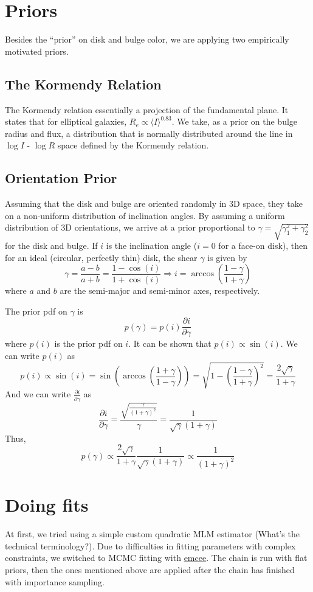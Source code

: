 \documentclass{article}
\newcommand{\comment}[1]{{\color{red} (#1)}}
\begin{document}
\section{Priors}
Besides the ``prior'' on disk and bulge color, we are applying two 
empirically motivated priors.
\subsection{The Kormendy Relation}
The Kormendy relation essentially a projection of the fundamental
plane.  It states that for elliptical galaxies, 
$R_e \propto \langle I \rangle^{0.83}$.  
We take, as a prior on the bulge radius and flux, a
distribution that is normally distributed around the line in $\log I$
- $\log R$ space defined by the Kormendy relation.

\subsection{Orientation Prior}
Assuming that the disk and bulge are oriented randomly in 3D space, 
they take on a non-uniform distribution of inclination angles.  By
assuming a uniform distribution of 3D orientations, we arrive at a
 prior proportional to $\gamma = \sqrt{\gamma_1^2 + \gamma_2^2}$ for the disk and bulge.
If $i$ is the inclination angle ($i = 0$ for a face-on disk), then for an ideal
(circular, perfectly thin) disk, the shear $\gamma$ is given by
\[
\gamma = \frac{a - b}{a + b} = \frac{1 - \cos(i)}{1 + \cos(i)}
\Rightarrow i = \arccos{\left( \frac{1 - \gamma}{1 + \gamma} \right) }
\]
where $a$ and $b$ are the semi-major and semi-minor axes, respectively.

The prior pdf on $\gamma$ is 
\[
p(\gamma) = p(i) \frac{\partial i}{\partial \gamma}
\]
where $p(i)$ is the prior pdf on $i$. It can be shown that
$p(i) \propto \sin (i)$.  We can write $p(i)$ as
\[
p(i) \propto \sin(i)
= \sin \left( \arccos \left( \frac{1 + \gamma}{1 - \gamma} \right) \right)
= \sqrt{1 - \left( \frac{1 - \gamma}{1 + \gamma} \right)^2}
= \frac{2 \sqrt{\gamma}}{1 + \gamma}
\]
And we can write $\frac{\partial i}{\partial \gamma}$ as
\[
\frac{\partial i}{\partial \gamma} 
= \frac{\sqrt{\frac{\gamma}{(1 + \gamma)^2}}}{\gamma}
= \frac{1}{\sqrt{\gamma} (1 + \gamma)}
\]
Thus, 
\[
p(\gamma) \propto \frac{2 \sqrt{\gamma}}{1 + \gamma} \frac{1}{\sqrt{\gamma} (1 + \gamma)}
\propto \frac{1}{(1 + \gamma)^2}
\]


\section{Doing fits}
At first, we tried using a simple custom quadratic MLM estimator
\comment{What's the technical terminology?}.  Due to difficulties in
fitting parameters with complex constraints, we switched to MCMC
fitting with \href{http://dan.iel.fm/emcee/current/}{emcee}.  The
chain is run with flat priors, then the ones mentioned above are
applied after the chain has finished with importance sampling.
\end{document}
